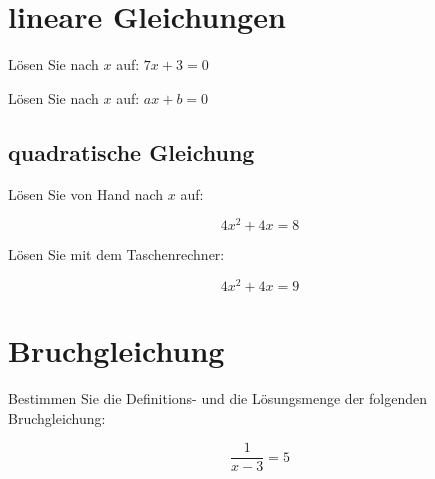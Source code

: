 \section{lineare Gleichungen}
Lösen Sie nach $x$ auf: $7x+3=0$ 

Lösen Sie nach $x$ auf: $ax + b = 0$ 



\subsection{quadratische Gleichung}
Lösen Sie von Hand nach $x$ auf:

$$4x^2 +4x = 8$$

Lösen Sie mit dem Taschenrechner:

$$4x^2 + 4x = 9$$

\section{Bruchgleichung}
Bestimmen Sie die Definitions- und die Lösungsmenge der folgenden Bruchgleichung:

$$\frac{1}{x-3} = 5$$


